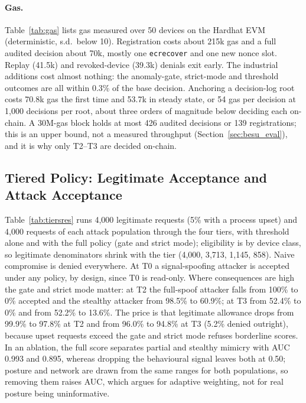 \paragraph{Gas.}\label{sec:gas} Table~\ref{tab:gas} lists gas measured over 50 devices on the Hardhat EVM (deterministic, s.d.\ below 10). Registration costs about 215k gas and a full audited decision about 70k, mostly one \texttt{ecrecover} and one new nonce slot. Replay (41.5k) and revoked-device (39.3k) denials exit early. The industrial additions cost almost nothing: the anomaly-gate, strict-mode and threshold outcomes are all within 0.3\% of the base decision. Anchoring a decision-log root costs 70.8k gas the first time and 53.7k in steady state, or 54 gas per decision at 1{,}000 decisions per root, about three orders of magnitude below deciding each on-chain. A 30M-gas block holds at most 426 audited decisions or 139 registrations; this is an upper bound, not a measured throughput (Section~\ref{sec:besu_eval}), and it is why only T2--T3 are decided on-chain.

\begin{table}[t]
\centering
\caption{Measured gas per operation (Hardhat EVM, solc 0.8.24, 50 devices)}
\label{tab:gas}
\scriptsize

\end{table}

\subsection{Tiered Policy: Legitimate Acceptance and Attack Acceptance}\label{sec:tiers_eval}
Table~\ref{tab:tiersres} runs 4{,}000 legitimate requests (5\% with a process upset) and 4{,}000 requests of each attack population through the four tiers, with threshold alone and with the full policy (gate and strict mode); eligibility is by device class, so legitimate denominators shrink with the tier (4{,}000, 3{,}713, 1{,}145, 858). Naive compromise is denied everywhere. At T0 a signal-spoofing attacker is accepted under any policy, by design, since T0 is read-only. Where consequences are high the gate and strict mode matter: at T2 the full-spoof attacker falls from 100\% to 0\% accepted and the stealthy attacker from 98.5\% to 60.9\%; at T3 from 52.4\% to 0\% and from 52.2\% to 13.6\%. The price is that legitimate allowance drops from 99.9\% to 97.8\% at T2 and from 96.0\% to 94.8\% at T3 (5.2\% denied outright), because upset requests exceed the gate and strict mode refuses borderline scores. In an ablation, the full score separates partial and stealthy mimicry with AUC 0.993 and 0.895, whereas dropping the behavioural signal leaves both at 0.50; posture and network are drawn from the same ranges for both populations, so removing them raises AUC, which argues for adaptive weighting, not for real posture being uninformative.

